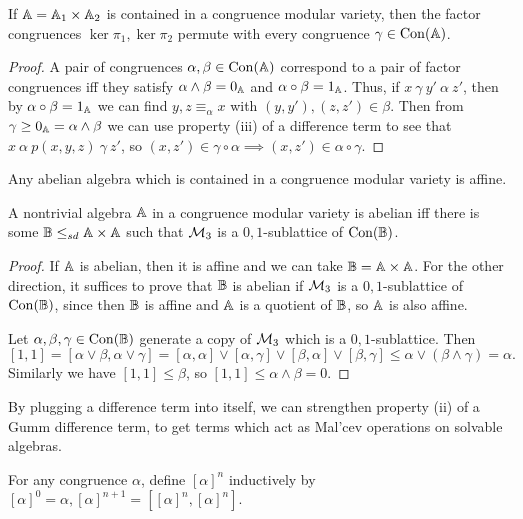 \begin{appendices}
\begin{cor} If $\mathbb{A} = \mathbb{A}_1\times \mathbb{A}_2$ is contained in a congruence modular variety, then the factor congruences $\ker \pi_1,\ker \pi_2$ permute with every congruence $\gamma \in \operatorname{Con}(\mathbb{A})$.
\end{cor}
\begin{proof} A pair of congruences $\alpha,\beta \in \operatorname{Con}(\mathbb{A})$ correspond to a pair of factor congruences iff they satisfy $\alpha \wedge \beta = 0_{\mathbb{A}}$ and $\alpha \circ \beta = 1_{\mathbb{A}}$. Thus, if $x\ \gamma\ y'\ \alpha\ z'$, then by $\alpha \circ \beta = 1_{\mathbb{A}}$ we can find $y, z \equiv_\alpha x$ with $(y,y'), (z,z') \in \beta$. Then from $\gamma \ge 0_{\mathbb{A}} = \alpha \wedge \beta$ we can use property (iii) of a difference term to see that $x\ \alpha\ p(x,y,z)\ \gamma\ z'$, so $(x,z') \in \gamma \circ \alpha \implies (x,z') \in \alpha \circ \gamma$.
\end{proof}

\begin{cor}\label{cor-modular-abelian} Any abelian algebra which is contained in a congruence modular variety is affine.
\end{cor}

\begin{cor} A nontrivial algebra $\mathbb{A}$ in a congruence modular variety is abelian iff there is some $\mathbb{B} \le_{sd} \mathbb{A}\times \mathbb{A}$ such that $\mathcal{M}_3$ is a $0,1$-sublattice of $\operatorname{Con}(\mathbb{B})$.
\end{cor}
\begin{proof} If $\mathbb{A}$ is abelian, then it is affine and we can take $\mathbb{B} = \mathbb{A}\times \mathbb{A}$. For the other direction, it suffices to prove that $\mathbb{B}$ is abelian if $\mathcal{M}_3$ is a $0,1$-sublattice of $\operatorname{Con}(\mathbb{B})$, since then $\mathbb{B}$ is affine and $\mathbb{A}$ is a quotient of $\mathbb{B}$, so $\mathbb{A}$ is also affine.

Let $\alpha, \beta, \gamma \in \operatorname{Con}(\mathbb{B})$ generate a copy of $\mathcal{M}_3$ which is a $0,1$-sublattice. Then
\[
[1,1] = [\alpha \vee \beta, \alpha \vee \gamma] = [\alpha,\alpha]\vee [\alpha,\gamma]\vee [\beta,\alpha]\vee [\beta,\gamma] \le \alpha \vee (\beta \wedge \gamma) = \alpha.
\]
Similarly we have $[1,1] \le \beta$, so $[1,1] \le \alpha \wedge \beta = 0$.
\end{proof}

By plugging a difference term into itself, we can strengthen property (ii) of a Gumm difference term, to get terms which act as Mal'cev operations on solvable algebras.

\begin{defn} For any congruence $\alpha$, define $[\alpha]^n$ inductively by $[\alpha]^0 = \alpha, [\alpha]^{n+1} = [[\alpha]^n,[\alpha]^n]$.
\end{defn}


\end{appendices}
